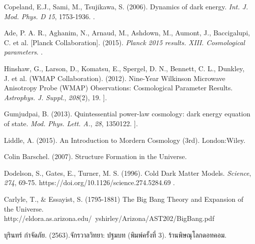 \begin{thebibliography}{99}

Copeland, E.J., Sami, M., Tsujikawa, S. (2006).
Dynamics of dark energy.
\textit{Int. J. Mod. Phys. D} \textit{15}, 1753-1936.
.

 Ade, P. A. R., Aghanim, N., Arnaud, M., Ashdown, M., Aumont, J., Baccigalupi, C. et al. [Planck Collaboration]. (2015).
\textit{Planck 2015 results. XIII. Cosmological parameters}.
.

Hinshaw, G., Larson, D., Komatsu, E., Spergel, D. N., Bennett, C. L., Dunkley, J. et al. (WMAP Collaboration). (2012).
Nine-Year Wilkinson Microwave Anisotropy Probe (WMAP) Observations: Cosmological Parameter Results.
\textit{Astrophys. J. Suppl.}, \textit{208}(2), 19.
\;[arXiv:1212.5226 [astro-ph.CO]].

Gumjudpai, B. (2013).
Quintessential power-law cosmology: dark energy equation of state.
\textit{Mod. Phys. Lett. A.}, \textit{28}, 1350122.
\;[arXiv:1307.4552 [astro-ph.CO]].

Liddle, A. (2015).
An Introduction to Mordern Cosmology (3rd).
London:Wiley.

Colin Barschel. (2007). Structure Formation in the Universe.

Dodelson, S., Gates, E., Turner, M. S. (1996).
Cold Dark Matter Models.
\textit{Science}, \textit{274}, 69-75.
https://doi.org/10.1126/science.274.5284.69
.

Carlyle, T., \& Essayist, S. (1795-1881) The Big Bang Theory and Expansion of the Universe.
http://eldora.as.arizona.edu/~yshirley/Arizona/AST202/BigBang.pdf

บุรินทร์ กำจัดภัย. (2563).จักรวาลวิทยา: ปฐมบท (พิมพ์ครั้งที่ 3). ร้านพิษณุโลกดอทคอม.


\end{thebibliography}